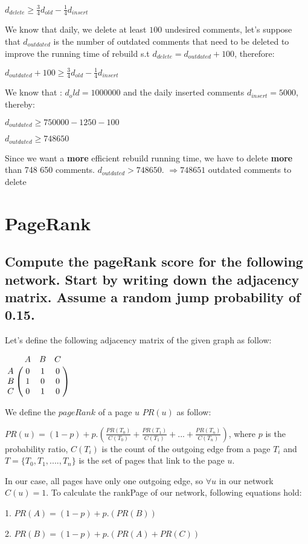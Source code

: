 \documentclass{scrartcl}
\begin{document}
$d_{delete} \geq  \frac{3}{4} d_{old}  - \frac{1}{4}  d_{insert} $

We know that daily, we delete at least $100$ undesired comments, let's suppose that $d_{outdated}$ is the number of outdated comments that need to be deleted to improve the running time of rebuild s.t $d_{delete}= d_{outdated} + 100$, therefore:

$d_{outdated} + 100 \geq \frac{3}{4} d_{old}  - \frac{1}{4}  d_{insert} $

We know that : $d_old = 1 000 000$ and the daily inserted comments $d_{insert} = 5000$, thereby:

$d_{outdated} \geq 750 000 - 1 250 - 100$

$d_{outdated} \geq 748 650$

Since we want a \textbf{more} efficient rebuild running time, we have to delete \textbf{more} than 748 650 comments. $d_{outdated} > 748 650$. $ \Rightarrow  748 651$ outdated comments to delete
  

\section{PageRank}

\subsection{Compute the pageRank score for the following network. Start by writing down the adjacency
matrix. Assume a random jump probability of 0.15.}

Let's define the following adjacency matrix of the given graph as follow:

 $
\bordermatrix{
  & A	& B   & C   \cr
A &0& 1 & 0 \cr
B & 1 & 0 &0 \cr
C & 0 & 1 & 0 \cr
}
$  

We define the $pageRank$ of a page $u$ $PR(u)$ as follow:

$PR(u) = (1- p) + p.( \frac{PR(T_0)}{C(T_0)} + \frac{PR(T_1)}{C(T_1)}+ ... + \frac{PR(T_n)}{C(T_n)})$, where $p$ is the probability ratio, $C(T_i)$ is the count of the outgoing edge from a page $T_i$ and $T = \{T_0 , T_1 , .... , T_n\}$ is the set of pages that link to the page $u$.

In our case, all pages have only one outgoing edge, so $\forall u $ in our network $C(u) = 1$. To calculate the rankPage of our network, following equations hold:

1. $PR(A) = (1 - p) + p.( PR(B))$

2. $PR(B) = (1 - p) + p.( PR(A) + PR(C))$
\end{document}
